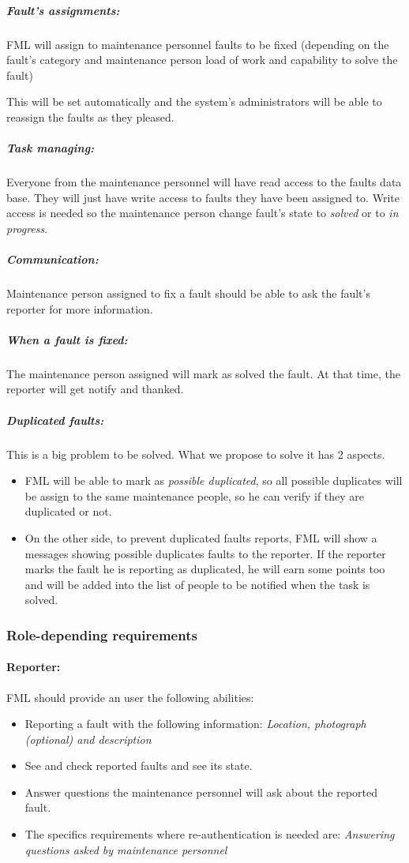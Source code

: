 \documentclass{report}
\begin{document}
\subparagraph{Fault's assignments: } FML will assign to maintenance personnel faults to be fixed (depending on the fault's category and maintenance person load of work and capability to solve the fault)

This will be set automatically and the system's administrators will be able to reassign the faults as they pleased.

\subparagraph{Task managing: } Everyone from the maintenance personnel will have read access to the faults data base. They will just have write access to faults they have been assigned to. Write access is needed so the maintenance person change fault's state to \textit{solved} or to \textit{in progress}.

\subparagraph{Communication: } Maintenance person assigned to fix a fault should be able to ask the fault's reporter for more information.

\subparagraph{When a fault is fixed: } The maintenance person assigned will mark as solved the fault. At that time, the reporter will get notify and thanked.

\subparagraph{Duplicated faults: } This is a big problem to be solved. What we propose to solve it has 2 aspects.
\begin{itemize}
\item FML will be able to mark as \textit{possible duplicated}, so all possible duplicates will be assign to the same maintenance people, so he can verify if they are duplicated or not.

\item On the other side, to prevent duplicated faults reports, FML will show a messages showing possible duplicates faults to the reporter. If the reporter marks the fault he is reporting as duplicated, he will earn some points too and will be added into the list of people to be notified when the task is solved.
\end{itemize}

\subsubsection{Role-depending requirements}

\paragraph{Reporter: } FML should provide an user the following abilities:
\begin{itemize}
\item Reporting a fault with the following information: \textit{Location, photograph (optional) and description}
\item See and check reported faults and see its state. 
\item Answer questions the maintenance personnel will ask about the reported fault.
\item The specifics requirements where re-authentication is needed are: \textit{Answering questions asked by maintenance personnel}   \label{Specifics_Secure_Requirements_for_user}
\end{itemize}
\end{document}
